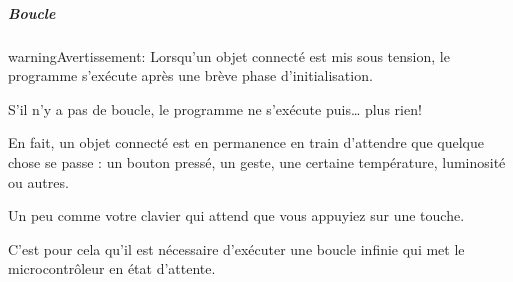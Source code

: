 \documentclass[letterpaper,10pt,french]{sphinxmanual}
\begin{document}
\subparagraph{Boucle}
\label{\detokenize{projets/goFast-python-coder:boucle}}
\begin{sphinxadmonition}{warning}{Avertissement:}
Lorsqu’un objet connecté est mis sous tension, le programme
s’exécute après une brève phase d’initialisation.

S’il n’y a pas de boucle, le programme ne s’exécute  puis… plus rien!

En fait, un objet connecté est en permanence en train d’attendre
que quelque chose se passe : un bouton pressé, un geste, une
certaine température, luminosité ou autres.

Un peu comme votre clavier qui attend  que vous
appuyiez sur une touche.

C’est pour cela qu’il est nécessaire d’exécuter une boucle infinie
qui met le microcontrôleur en état d’attente.
\end{sphinxadmonition}
\end{document}
